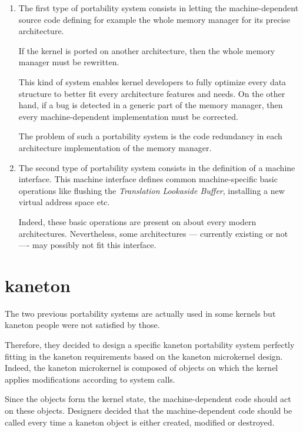 \begin{enumerate}
  \item
    The first type of portability system consists in letting the
    machine-dependent source code defining for example the whole memory manager
    for its precise architecture.

    \-

    If the kernel is ported on another architecture, then the whole memory
    manager must be rewritten.

    \-

    This kind of system enables kernel developers to fully optimize every
    data structure to better fit every architecture features and needs. On
    the other hand, if a bug is detected in a generic part of the memory
    manager, then every machine-dependent implementation must be corrected.

    \-

    The problem of such a portability system is the code redundancy in each
    architecture implementation of the memory manager.
  \item
    The second type of portability system consists in the definition of
    a machine interface. This machine interface defines common machine-specific
    basic operations like flushing the \textit{Translation Lookaside Buffer},
    installing a new virtual address space etc.

    \-

    Indeed, these basic operations are present on about every modern
    architectures. Nevertheless, some architectures --- currently existing or
    not ---- may possibly not fit this interface.
\end{enumerate}

%
%

\section{kaneton}

The two previous portability systems are actually used in some kernels but
kaneton people were not satisfied by those.

Therefore, they decided to design a specific kaneton portability system
perfectly fitting in the kaneton requirements based on the kaneton microkernel
design. Indeed, the kaneton microkernel is composed of objects on which
the kernel applies modifications according to system calls.

Since the objects form the kernel state, the machine-dependent code should
act on these objects. Designers decided that the machine-dependent code
should be called every time a kaneton object is either created, modified or
destroyed.

